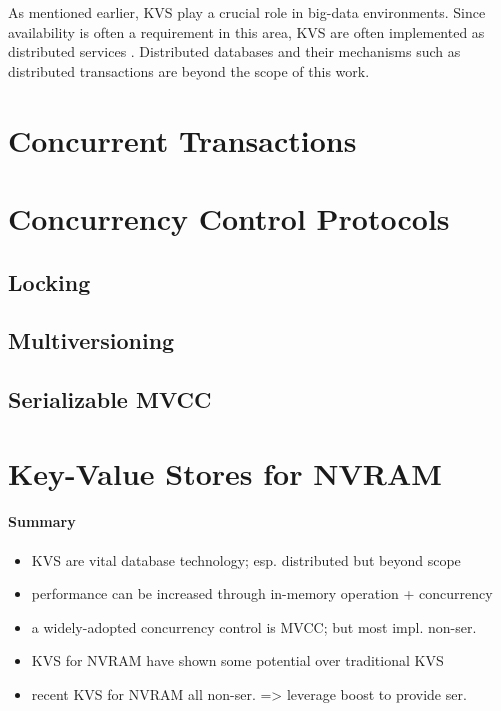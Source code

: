 As mentioned earlier, KVS play a crucial role in big-data environments. Since
availability is often a requirement in this area, KVS are often implemented as
distributed services \cite{decandia2007dynamo, lakshman2010cassandra,
wang2015hydradb}. Distributed databases and their mechanisms such as distributed
transactions are beyond the scope of this work.

\section{Concurrent Transactions}

\section{Concurrency Control Protocols}

\subsection{Locking}

\subsection{Multiversioning}

\subsection{Serializable MVCC}

\section{Key-Value Stores for NVRAM}

\paragraph{Summary}

\begin{itemize}
    \item KVS are vital database technology; esp. distributed but beyond scope
    \item performance can be increased through in-memory operation + concurrency
    \item a widely-adopted concurrency control is MVCC; but most impl. non-ser.
    \item KVS for NVRAM have shown some potential over traditional KVS
    \item recent KVS for NVRAM all non-ser. => leverage boost to provide ser.
\end{itemize}
